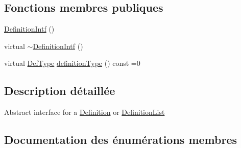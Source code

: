 \subsection*{Fonctions membres publiques}
\begin{DoxyCompactItemize}
\item 
\hyperlink{class_definition_intf_a2589f23752497ae83e5894eb25bfe688}{Definition\+Intf} ()
\item 
virtual \hyperlink{class_definition_intf_a348acc4ce6b1a3490d32e8aedd2183a4}{$\sim$\+Definition\+Intf} ()
\item 
virtual \hyperlink{class_definition_intf_ada60114bc621669dd8c19edfc6421766}{Def\+Type} \hyperlink{class_definition_intf_a7ceed0c1683dd3e1d9c208c63824c875}{definition\+Type} () const  =0
\end{DoxyCompactItemize}


\subsection{Description détaillée}
Abstract interface for a \hyperlink{class_definition}{Definition} or \hyperlink{class_definition_list}{Definition\+List} 

\subsection{Documentation des énumérations membres}
\hypertarget{class_definition_intf_ada60114bc621669dd8c19edfc6421766}{}
